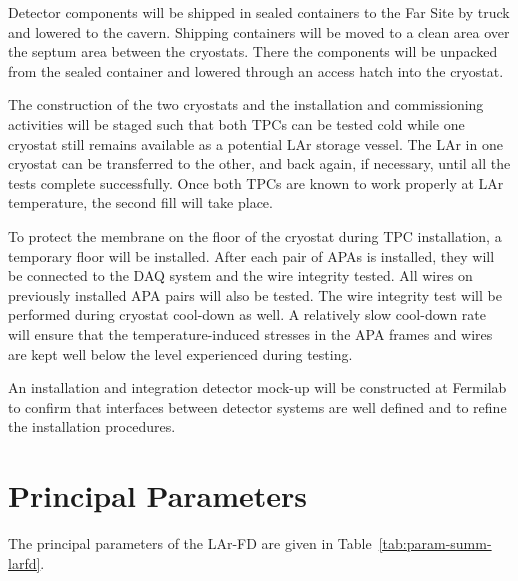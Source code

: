 Detector components will be shipped in sealed containers to the Far Site by truck and lowered to the cavern. Shipping containers will be moved to a clean area over the septum area between the cryostats. There the components will be unpacked from the sealed container and lowered  through an access hatch into the cryostat. 

The construction of the two cryostats and the installation and commissioning activities will
be staged such that both TPCs can be tested cold while one cryostat still remains available
as a potential LAr storage vessel. The LAr in one cryostat can be transferred to the other, and
back again, if necessary, until all the tests complete successfully. Once both TPCs are known to work properly at LAr temperature, the second fill will take place.

To protect the membrane on the floor of the cryostat during TPC installation, a temporary floor will be installed. 
After each pair of APAs is installed, they will be connected to the DAQ system and the wire integrity tested. All wires on previously installed APA pairs will also be tested. The wire integrity test will be performed during cryostat cool-down as well. A relatively slow cool-down rate will ensure that the temperature-induced stresses in the APA frames and wires are kept well below the level experienced during testing. 

An installation and integration detector mock-up will be constructed at Fermilab to confirm that interfaces between detector systems are well defined and to refine the installation procedures. 

\section{Principal Parameters}

The principal parameters of the LAr-FD are given in Table~\ref{tab:param-summ-larfd}. 

